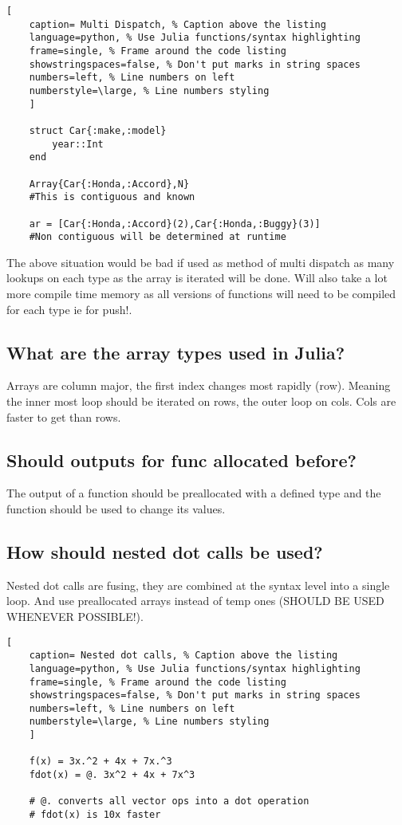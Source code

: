 \documentclass[11pt]{scrartcl} %
\begin{document}
\begin{lstlisting}[
	caption= Multi Dispatch, % Caption above the listing
	language=python, % Use Julia functions/syntax highlighting
	frame=single, % Frame around the code listing
	showstringspaces=false, % Don't put marks in string spaces
	numbers=left, % Line numbers on left
	numberstyle=\large, % Line numbers styling
	]

	struct Car{:make,:model}
		year::Int
	end

	Array{Car{:Honda,:Accord},N} 
	#This is contiguous and known

	ar = [Car{:Honda,:Accord}(2),Car{:Honda,:Buggy}(3)] 
	#Non contiguous will be determined at runtime

\end{lstlisting}

The above situation would be bad if used as method of multi dispatch as many lookups on each
type as the array is iterated will be done. Will also take a lot more compile time memory
as all versions of functions will need to be compiled for each type ie for push!.

\subsection{What are the array types used in Julia?}

Arrays are column major, the first index changes most rapidly (row). Meaning the inner most loop
should be iterated on rows, the outer loop on cols. Cols are faster to get than rows.

\subsection{Should outputs for func allocated before?}

The output of a function should be preallocated with a defined type and the function should be
used to change its values.

\subsection{How should nested dot calls be used?}

Nested dot calls are fusing, they are combined at the syntax level into a single loop. And use
preallocated arrays instead of temp ones (SHOULD BE USED WHENEVER POSSIBLE!).\\

\begin{lstlisting}[
	caption= Nested dot calls, % Caption above the listing
	language=python, % Use Julia functions/syntax highlighting
	frame=single, % Frame around the code listing
	showstringspaces=false, % Don't put marks in string spaces
	numbers=left, % Line numbers on left
	numberstyle=\large, % Line numbers styling
	]

	f(x) = 3x.^2 + 4x + 7x.^3
	fdot(x) = @. 3x^2 + 4x + 7x^3 

	# @. converts all vector ops into a dot operation
	# fdot(x) is 10x faster

\end{lstlisting}
\end{document}
